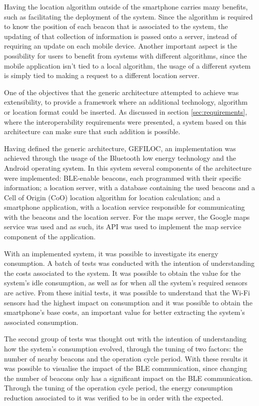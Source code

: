  
Having the location algorithm outside of the smartphone carries many benefits, such as facilitating the deployment of the system. Since the algorithm is required to know the position of each beacon that is associated to the system, the updating of that collection of information is passed onto a server, instead of requiring an update on each mobile device. Another important aspect is the possibility for users to benefit from systems with different algorithms, since the mobile application isn't tied to a local algorithm, the usage of a different system is simply tied to making a request to a different location server.  
 
 
One of the objectives that the generic architecture attempted to achieve was extensibility, to provide a framework where an additional technology, algorithm or location format could be inserted. As discussed in section \ref{sec:requirements}, where the interoperability requirements were presented, a system based on this architecture can make sure that such addition is possible.  
 
 
Having defined the generic architecture, GEFILOC, an implementation was achieved through the usage of the Bluetooth low energy technology and the Android operating system. In this system several components of the architecture were implemented: BLE-enable beacons, each programmed with their specific information; a location server, with a database containing the used beacons and a Cell of Origin (CoO) location algorithm for location calculation; and a smartphone application, with a location service responsible for communicating with the beacons and the location server. For the maps server, the Google maps service was used and as such, its API was used to implement the map service component of the application. 
 
 
With an implemented system, it was possible to investigate its energy consumption. A batch of tests was conducted with the intention of understanding the costs associated to the system. It was possible to obtain the value for the system's idle consumption, as well as for when all the system's required sensors are active. From these initial tests, it was possible to understand that the Wi-Fi sensors had the highest impact on consumption and it was possible to obtain the smartphone's base costs, an important value for better extracting the system's associated consumption. 
 
 
The second group of tests was thought out with the intention of understanding how the system's consumption evolved, through the tuning of two factors: the number of nearby beacons and the operation cycle period. With these results it was possible to visualise the impact of the BLE communication, since changing the number of beacons only has a significant impact on the BLE communication. Through the tuning of the operation cycle period, the energy consumption reduction associated to it was verified to be in order with the expected. 
 
